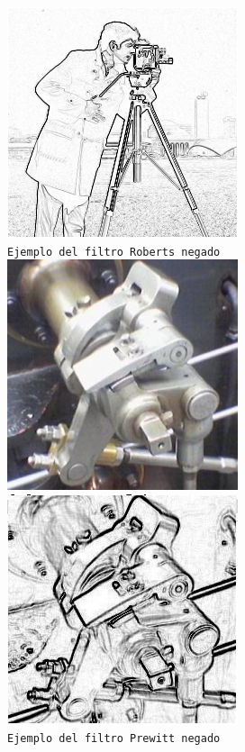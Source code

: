 \begin{center}
\includegraphics[scale=0.5]{imgs/cameraman-roberts-neg.jpg} \\
\texttt{\small Ejemplo del filtro Roberts negado}\\
\includegraphics[scale=0.5]{imgs/steam-engine.jpg}
\includegraphics[scale=0.5]{imgs/steam-engine-prewitt-neg.jpg} \\
\texttt{\small Ejemplo del filtro Prewitt negado} \\
\end{center}
\vspace{1cm}


